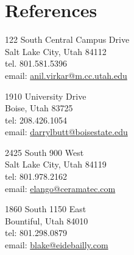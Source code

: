 \documentclass[letterpaper]{deedy-resume} %
\begin{document}
\section{References}
\begin{minipage}[t]{0.55\textwidth} %

122 South Central Campus Drive \\
Salt Lake City, Utah 84112 \\
tel. 801.581.5396 \\
email: \href{anil.virkar@m.cc.utah.edu}{anil.virkar@m.cc.utah.edu} \\

\sectionspace

1910 University Drive \\
Boise, Utah 83725 \\
tel: 208.426.1054 \\
email: \href{darrylbutt@boisestate.edu}{darrylbutt@boisestate.edu} \\


\end{minipage}
\hfill
\begin{minipage}[t]{0.4\textwidth} %

2425 South 900 West \\
Salt Lake City, Utah 84119 \\
tel: 801.978.2162 \\
email: \href{elango@ceramatec.com}{elango@ceramatec.com} \\

\sectionspace

1860 South 1150 East \\
Bountiful, Utah 84010 \\
tel: 801.298.0879 \\
email: \href{blake@eidebailly.com}{blake@eidebailly.com} \\

\sectionspace

\end{minipage} %
\end{document}
